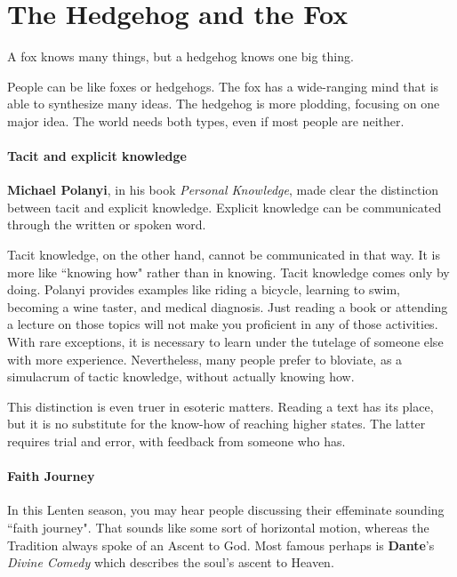 \section{The Hedgehog and the Fox}

\begin{quotex}
A fox knows many things, but a hedgehog knows one big thing. 

\end{quotex}
People can be like foxes or hedgehogs. The fox has a wide-ranging mind that is able to synthesize many ideas. The hedgehog is more plodding, focusing on one major idea. The world needs both types, even if most people are neither.

\paragraph{Tacit and explicit knowledge}
\textbf{Michael Polanyi}, in his book \emph{Personal Knowledge}, made clear the distinction between tacit and explicit knowledge. Explicit knowledge can be communicated through the written or spoken word.

Tacit knowledge, on the other hand, cannot be communicated in that way. It is more like ``knowing how" rather than in knowing. Tacit knowledge comes only by doing. Polanyi provides examples like riding a bicycle, learning to swim, becoming a wine taster, and medical diagnosis. Just reading a book or attending a lecture on those topics will not make you proficient in any of those activities. With rare exceptions, it is necessary to learn under the tutelage of someone else with more experience. Nevertheless, many people prefer to bloviate, as a simulacrum of tactic knowledge, without actually knowing how.

This distinction is even truer in esoteric matters. Reading a text has its place, but it is no substitute for the know-how of reaching higher states. The latter requires trial and error, with feedback from someone who has.

\paragraph{Faith Journey}
In this Lenten season, you may hear people discussing their effeminate sounding ``faith journey". That sounds like some sort of horizontal motion, whereas the Tradition always spoke of an Ascent to God. Most famous perhaps is \textbf{Dante}'s \emph{Divine Comedy }which describes the soul's ascent to Heaven.

